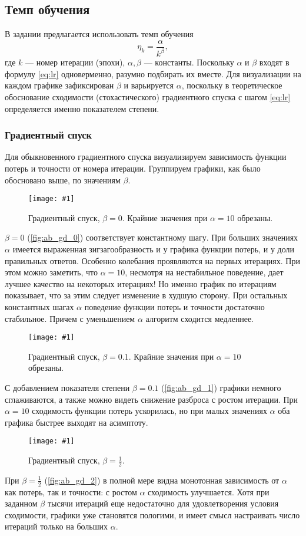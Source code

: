 \documentclass[12pt]{article}
\newcommand{\mpl}[2]{
    \begin{figure}[!h]
        \texttt{[image: \#1]}
        \centering
        \caption{#2}
        \label{fig:#1}
     \end{figure}
}
\begin{document}
\subsection{Темп обучения}
В задании предлагается использовать темп обучения
\begin{equation}
    \label{eq:lr}
    \eta_k=\frac{\alpha}{k^{\beta}},
\end{equation}
где $k$ — номер итерации (эпохи), $\alpha, \beta$ — константы. Поскольку $\alpha$ и $\beta$ входят в формулу \eqref{eq:lr} одноверменно, разумно подбирать их вместе. Для визуализации на каждом графике зафиксирован $\beta$ и варьируется $\alpha$, поскольку в теоретическое обоснование сходимости (стохастического) градиентного спуска с шагом \eqref{eq:lr} определяется именно показателем степени.

\subsubsection{Градиентный спуск}
Для обыкновенного градиентного спуска визуализируем зависимость функции потерь и точности от номера итерации. Группируем графики, как было обосновано выше, по значениям $\beta$.

\mpl{ab_gd_0}{Градиентный спуск, $\beta=0$. Крайние значения при $\alpha=10$ обрезаны.}
$\beta=0$ (\autoref{fig:ab_gd_0}) соответствует константному шагу. При больших значениях $\alpha$ имеется выраженная зигзагообразность и у графика функции потерь, и у доли правильных ответов. Особенно колебания проявляются на первых итерациях. При этом можно заметить, что $\alpha=10$, несмотря на нестабильное поведение, дает лучшее качество на некоторых итерациях! Но именно график по итерациям показывает, что за этим следует изменение в худшую сторону. При остальных константных шагах $\alpha$ поведение функции потерь и точности достаточно стабильное. Причем с уменьшением $\alpha$ алгоритм сходится медленнее.

\mpl{ab_gd_1}{Градиентный спуск, $\beta=0.1$. Крайние значения при $\alpha=10$ обрезаны.}
С добавлением показателя степени $\beta=0.1$ (\autoref{fig:ab_gd_1}) графики немного сглаживаются, а также можно видеть снижение разброса с ростом итерации. При $\alpha=10$ сходимость функции потерь ускорилась, но при малых значениях $\alpha$ оба графика быстрее выходят на асимптоту.

\mpl{ab_gd_2}{Градиентный спуск, $\beta=\frac{1}{2}$.}
При $\beta=\frac{1}{2}$ (\autoref{fig:ab_gd_2}) в полной мере видна монотонная зависимость от $\alpha$ как потерь, так и точности: с ростом $\alpha$ сходимость улучшается. Хотя при заданном $\beta$ тысячи итераций еще недостаточно для удовлетворения условия сходимости, графики уже становятся пологими, и имеет смысл настраивать число итераций только на больших $\alpha$.
\end{document}

